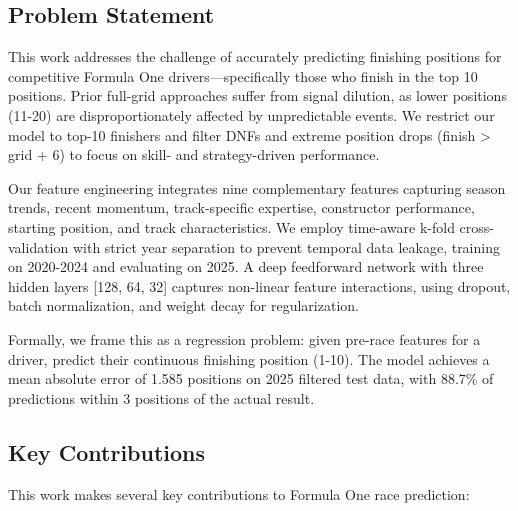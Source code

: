 \documentclass{article}
\begin{document}
\subsection{Problem Statement}

This work addresses the challenge of accurately predicting finishing positions for competitive Formula One drivers—specifically those who finish in the top 10 positions. Prior full-grid approaches suffer from signal dilution, as lower positions (11-20) are disproportionately affected by unpredictable events. We restrict our model to top-10 finishers and filter DNFs and extreme position drops (finish > grid + 6) to focus on skill- and strategy-driven performance.

Our feature engineering integrates nine complementary features capturing season trends, recent momentum, track-specific expertise, constructor performance, starting position, and track characteristics. We employ time-aware k-fold cross-validation with strict year separation to prevent temporal data leakage, training on 2020-2024 and evaluating on 2025. A deep feedforward network with three hidden layers [128, 64, 32] captures non-linear feature interactions, using dropout, batch normalization, and weight decay for regularization.

Formally, we frame this as a regression problem: given pre-race features for a driver, predict their continuous finishing position (1-10). The model achieves a mean absolute error of 1.585 positions on 2025 filtered test data, with 88.7\% of predictions within 3 positions of the actual result.



\subsection{Key Contributions}

This work makes several key contributions to Formula One race prediction:
\end{document}
